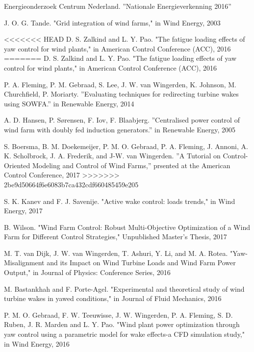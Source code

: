 \begin{thebibliography}{99} %

Energieonderzoek Centrum Nederland. ''Nationale Energieverkenning 2016''

J. O. G. Tande. "Grid integration of wind farms," in Wind Energy, 2003

<<<<<<< HEAD
D. S. Zalkind and L. Y. Pao. "The fatigue loading effects of yaw control for wind plants," in American Control Conference (ACC), 2016
=======
 D. S. Zalkind and L. Y. Pao. "The fatigue loading effects of yaw control for wind plants," in American Control Conference (ACC), 2016
 
P. A. Fleming, P. M. Gebraad, S. Lee, J. W. van Wingerden, K. Johnson, M. Churchfield, P. Moriarty. ''Evaluating techniques for redirecting turbine wakes using SOWFA.'' in Renewable Energy, 2014

A. D. Hansen, P. Sørensen, F. Iov, F. Blaabjerg. ''Centralised power control of wind farm with doubly fed induction generators.'' in Renewable Energy, 2005

S. Boersma, B. M. Doekemeijer, P. M. O. Gebraad, P. A. Fleming, J. Annoni,
A. K. Scholbrock, J. A. Frederik, and J-W. van Wingerden. ''A Tutorial on Control-Oriented Modeling and Control of Wind Farms,''
prsented at the American Control Conference, 2017
>>>>>>> 2be9d50664f6e6083b7ca432cdf660485459e205

S. K. Kanev and F. J. Savenije. "Active wake control: loads trends," in Wind Energy, 2017

B. Wilson. "Wind Farm Control: Robust Multi-Objective Optimization of a Wind Farm for Different Control Strategies," Unpublished Master's Thesis, 2017

M. T. van Dijk, J. W. van Wingerden, T. Ashuri, Y. Li, and M. A. Rotea. "Yaw-Misalignment and its Impact on Wind Turbine Loads and Wind Farm Power Output," in Journal of Physics: Conference Series, 2016

M. Bastankhah and F. Porte-Agel. "Experimental and theoretical study of wind turbine wakes in yawed conditions," in Journal of Fluid Mechanics, 2016

P. M. O. Gebraad, F. W. Teeuwisse, J. W. Wingerden, P. A. Fleming, S. D. Ruben, J. R. Marden and L. Y. Pao. "Wind plant power optimization through yaw control using a parametric model for wake effects-a CFD simulation study," in Wind Energy, 2016


\end{thebibliography}
